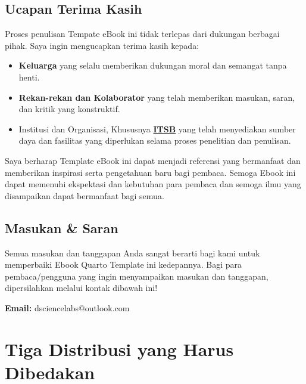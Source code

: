\documentclass[
  indonesian,
  letterpaper,
]{book}
\providecommand{\tightlist}{%
  \setlength{\itemsep}{0pt}\setlength{\parskip}{0pt}}
\begin{document}
\section*{Ucapan Terima Kasih}\label{ucapan-terima-kasih}


Proses penulisan Tempate eBook ini tidak terlepas dari dukungan berbagai
pihak. Saya ingin mengucapkan terima kasih kepada:

\begin{itemize}
\tightlist
\item
  \textbf{Keluarga} yang selalu memberikan dukungan moral dan semangat
  tanpa henti.
\item
  \textbf{Rekan-rekan dan Kolaborator} yang telah memberikan masukan,
  saran, dan kritik yang konstruktif.
\item
  Institusi dan Organisasi, Khususnya
  \textbf{\href{https://itsb.ac.id/}{ITSB}} yang telah menyediakan
  sumber daya dan fasilitas yang diperlukan selama proses penelitian dan
  penulisan.
\end{itemize}

Saya berharap Template eBook ini dapat menjadi referensi yang bermanfaat
dan memberikan inspirasi serta pengetahuan baru bagi pembaca. Semoga
Ebook ini dapat memenuhi ekspektasi dan kebutuhan para pembaca dan
semoga ilmu yang disampaikan dapat bermanfaat bagi semua.

\section*{Masukan \& Saran}\label{masukan-saran}


Semua masukan dan tanggapan Anda sangat berarti bagi kami untuk
memperbaiki Ebook Quarto Template ini kedepannya. Bagi para
pembaca/pengguna yang ingin menyampaikan masukan dan tanggapan,
dipersilahkan melalui kontak dibawah ini!

\textbf{Email:} dsciencelabs@outlook.com


\chapter{Tiga Distribusi yang Harus
Dibedakan}\label{tiga-distribusi-yang-harus-dibedakan}
\end{document}
